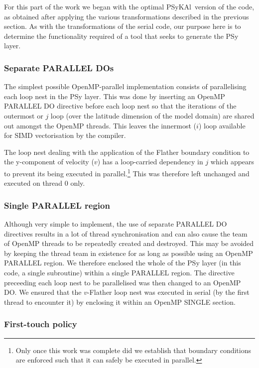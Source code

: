 \documentclass[journal]{IEEEtran}
\newcommand{\psykal}{{PS}y{KA}l}
\begin{document}
For this part of the work we began with the optimal \psykal\ version of
the code, as obtained after applying the various transformations
described in the previous section. As with the transformations of the
serial code, our purpose here is to determine the functionality
required of a tool that seeks to generate the PSy layer.

\subsubsection{Separate PARALLEL DOs}
\label{sec_sep_dos}

The simplest possible OpenMP-parallel implementation consists of
parallelising each loop nest in the PSy layer. This was done by
inserting an OpenMP PARALLEL DO directive before each loop nest so
that the iterations of the outermost or $j$ loop (over the latitude
dimension of the model domain) are shared out amongst the OpenMP
threads. This leaves the innermost ($i$) loop available for SIMD
vectorisation by the compiler.

The loop nest dealing with the application of the Flather boundary
condition to the y-component of velocity ($v$) has a loop-carried
dependency in $j$ which appears to prevent its being executed in
parallel.\footnote{Only once this work was complete did we establish
  that boundary conditions are enforced such that it can safely be
  executed in parallel.}  This was therefore left unchanged and
executed on thread 0 only.

\subsubsection{Single PARALLEL region}
\label{sec_single_parallel}

Although very simple to implement, the use of separate PARALLEL DO
directives results in a lot of thread synchronisation and can also
cause the team of OpenMP threads to be repeatedly created and
destroyed. This may be avoided by keeping the thread team in existence
for as long as possible using an OpenMP PARALLEL region.  We therefore
enclosed the whole of the PSy layer (in this code, a single
subroutine) within a single PARALLEL region. The directive preceeding
each loop nest to be parallelised was then changed to an OpenMP DO. We
ensured that the $v$-Flather loop nest was executed in serial (by the
first thread to encounter it) by enclosing it within an OpenMP SINGLE
section.

\subsubsection{First-touch policy}
\label{sec_1sttouch}
\end{document}
